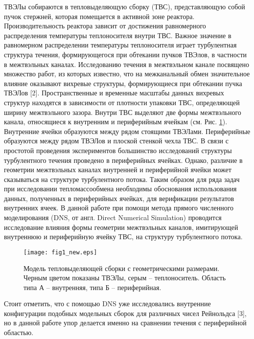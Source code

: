 ТВЭЛы собираются в тепловыделяющую сборку (ТВС), представляющую собой пучок стержней, которая помещается в активной зоне реактора. 
%
Производительность реактора зависит от достижения равномерного распределения температуры теплоносителя внутри ТВС. 
%
Важное значение в равномерном распределении температуры теплоносителя играет турбулентная структура течения, формирующегося при обтекании пучков ТВЭлов, в частности в межтвэльных каналах. 
%
Исследованию течения в межтвэльном канале посвящено множество работ, из которых известно, что на межканальный обмен значительное влияние оказывают вихревые структуры, формирующиеся при обтекании пучка ТВЭЛов [2]. 
%
Пространственные и временные масштабы данных вихревых структур находятся в зависимости от плотности упаковки ТВС, определяющей ширину межтвэльного зазора.
%
Внутри ТВС выделяют две формы межтвэльного канала, относящиеся к внутренним и периферийным ячейкам (см. Рис. \ref{fig:1}). 
%
Внутренние ячейки образуются между рядом стоящими ТВЭЛами.
%
Периферийные образуются между рядом ТВЭЛов и плоской стенкой чехла ТВС. 
%
В связи с простотой проведения экспериментов большинство исследований структуры турбулентного течения проведено в периферийных ячейках.
%
Однако, различие в геометрии межтвэльных каналах внутренней и периферийной ячейки может сказываться на структуре турбулентного потока.
%
Таким образом для ряда задач при исследовании тепломассообмена необходимы обоснования использования данных, полученных в периферийных ячейках, для верификации результатов внутренних ячеек.
%
В данной работе при помощи метода прямого численного моделирования (DNS, от англ. Direct Numerical Simulation) проводится исследование влияния формы геометрии межтвэльных каналов, имитирующей внутреннюю и периферийную ячейку ТВС, на структуру турбулентного потока. 
%
%
\begin{figure}[h!]
  \centering
  \texttt{[image: fig1\_new.eps]}
  \caption{Модель тепловыделяющей сборки с геометрическими размерами. Черным цветом показаны ТВЭЛы, серым -- теплоноситель. Область типа А -- внутренняя, типа Б -- периферийная.}
  \label{fig:1}
\end{figure}
%


Стоит отметить, что с помощью DNS уже исследовались внутренние конфигурации подобных модельных сборок для различных чисел Рейнольдса [3], но в данной работе упор делается именно на сравнении течения с периферийной областью.
%


